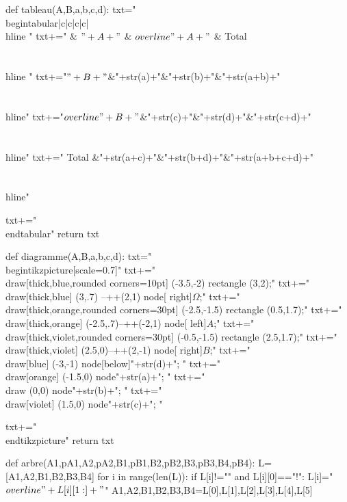 \begin{pycode}
def tableau(A,B,a,b,c,d):
    txt="\\begin{tabular}{|c|c|c|c|} \\hline "
    txt+="  & $"+A+"$ & $\\overline{"+A+"}$ & Total \\\\ \\hline  "
    txt+="$"+B+"$&"+str(a)+"&"+str(b)+"&"+str(a+b)+"\\\\ \\hline"
    txt+="$\\overline{"+B+"}$&"+str(c)+"&"+str(d)+"&"+str(c+d)+"\\\\ \\hline"
    txt+=" Total &"+str(a+c)+"&"+str(b+d)+"&"+str(a+b+c+d)+"\\\\ \\hline"
    
    txt+="\\end{tabular}"
    return txt
    
def diagramme(A,B,a,b,c,d):
	txt="\\begin{tikzpicture}[scale=0.7]"
	txt+="\\draw[thick,blue,rounded corners=10pt] (-3.5,-2) rectangle (3,2);"
	txt+="\\draw[thick,blue] (3,.7) --++(2,1) node[ right]{$\Omega$};"
	txt+="\\draw[thick,orange,rounded corners=30pt] (-2.5,-1.5) rectangle (0.5,1.7);"
	txt+="\\draw[thick,orange] (-2.5,.7)--++(-2,1) node[ left]{$A$};"
	txt+="\\draw[thick,violet,rounded corners=30pt] (-0.5,-1.5) rectangle (2.5,1.7);"
	txt+="\\draw[thick,violet] (2.5,0)--++(2,-1) node[ right]{$B$};"
	txt+="\\draw[blue] (-3,-1) node[below]{"+str(d)+"}; "
	txt+="\\draw[orange] (-1.5,0) node{"+str(a)+"}; "
	txt+="\\draw (0,0) node{"+str(b)+"}; "
	txt+="\\draw[violet] (1.5,0) node{"+str(c)+"}; "
	

	txt+="\\end{tikzpicture}"
	return txt
	
def arbre(A1,pA1,A2,pA2,B1,pB1,B2,pB2,B3,pB3,B4,pB4):
    L=[A1,A2,B1,B2,B3,B4]
    for i in range(len(L)):
        if L[i]!="" and L[i][0]=="!":
            L[i]="$\\overline{"+L[i][1:]+"}$"
    A1,A2,B1,B2,B3,B4=L[0],L[1],L[2],L[3],L[4],L[5]


\end{pycode}
